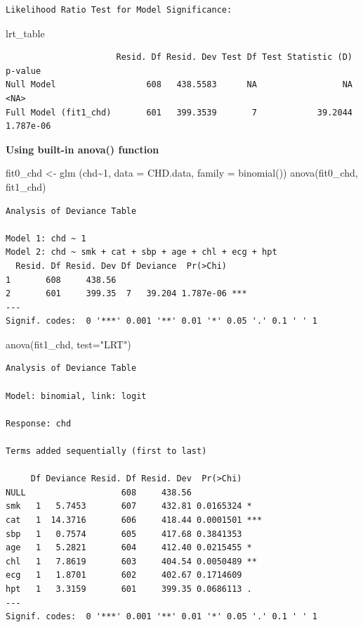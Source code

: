 \documentclass[
  letterpaper,
  DIV=11,
  numbers=noendperiod]{scrreprt}
\newenvironment{Shaded}{\begin{snugshade}}{\end{snugshade}}
\newcommand{\AttributeTok}[1]{\textcolor[rgb]{0.40,0.45,0.13}{#1}}
\newcommand{\DecValTok}[1]{\textcolor[rgb]{0.68,0.00,0.00}{#1}}
\newcommand{\FunctionTok}[1]{\textcolor[rgb]{0.28,0.35,0.67}{#1}}
\newcommand{\NormalTok}[1]{\textcolor[rgb]{0.00,0.23,0.31}{#1}}
\newcommand{\OtherTok}[1]{\textcolor[rgb]{0.00,0.23,0.31}{#1}}
\newcommand{\SpecialCharTok}[1]{\textcolor[rgb]{0.37,0.37,0.37}{#1}}
\newcommand{\StringTok}[1]{\textcolor[rgb]{0.13,0.47,0.30}{#1}}
\begin{document}
\begin{verbatim}
Likelihood Ratio Test for Model Significance:
\end{verbatim}

\begin{Shaded}
\begin{Highlighting}[]
\NormalTok{lrt\_table}
\end{Highlighting}
\end{Shaded}

\begin{verbatim}
                      Resid. Df Resid. Dev Test Df Test Statistic (D)   p-value
Null Model                  608   438.5583      NA                 NA      <NA>
Full Model (fit1_chd)       601   399.3539       7            39.2044 1.787e-06
\end{verbatim}

\textbf{Using built-in anova() function}

\begin{Shaded}
\begin{Highlighting}[]
\NormalTok{fit0\_chd }\OtherTok{\textless{}{-}} \FunctionTok{glm}\NormalTok{ (chd}\SpecialCharTok{\textasciitilde{}}\DecValTok{1}\NormalTok{, }\AttributeTok{data =}\NormalTok{ CHD.data, }\AttributeTok{family =} \FunctionTok{binomial}\NormalTok{())}
\FunctionTok{anova}\NormalTok{(fit0\_chd, fit1\_chd)}
\end{Highlighting}
\end{Shaded}

\begin{verbatim}
Analysis of Deviance Table

Model 1: chd ~ 1
Model 2: chd ~ smk + cat + sbp + age + chl + ecg + hpt
  Resid. Df Resid. Dev Df Deviance  Pr(>Chi)    
1       608     438.56                          
2       601     399.35  7   39.204 1.787e-06 ***
---
Signif. codes:  0 '***' 0.001 '**' 0.01 '*' 0.05 '.' 0.1 ' ' 1
\end{verbatim}

\begin{Shaded}
\begin{Highlighting}[]
\FunctionTok{anova}\NormalTok{(fit1\_chd, }\AttributeTok{test=}\StringTok{"LRT"}\NormalTok{)}
\end{Highlighting}
\end{Shaded}

\begin{verbatim}
Analysis of Deviance Table

Model: binomial, link: logit

Response: chd

Terms added sequentially (first to last)

     Df Deviance Resid. Df Resid. Dev  Pr(>Chi)    
NULL                   608     438.56              
smk   1   5.7453       607     432.81 0.0165324 *  
cat   1  14.3716       606     418.44 0.0001501 ***
sbp   1   0.7574       605     417.68 0.3841353    
age   1   5.2821       604     412.40 0.0215455 *  
chl   1   7.8619       603     404.54 0.0050489 ** 
ecg   1   1.8701       602     402.67 0.1714609    
hpt   1   3.3159       601     399.35 0.0686113 .  
---
Signif. codes:  0 '***' 0.001 '**' 0.01 '*' 0.05 '.' 0.1 ' ' 1
\end{verbatim}
\end{document}
